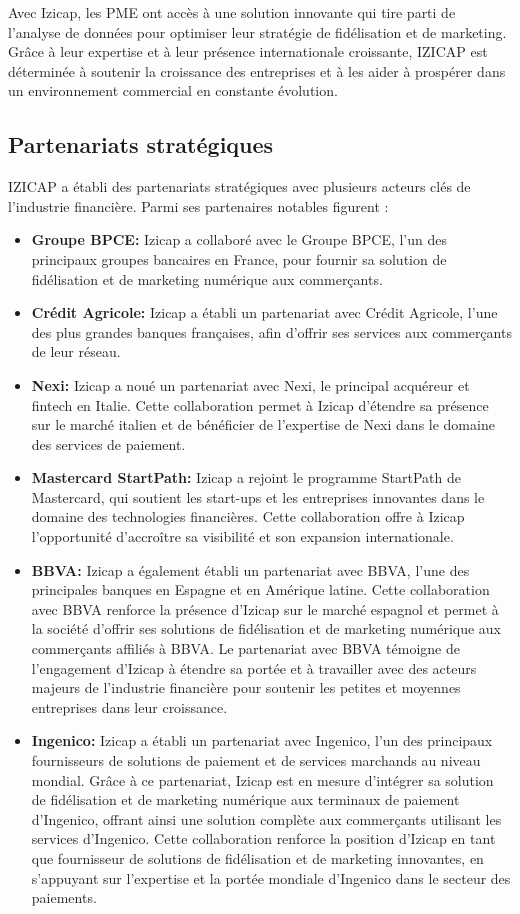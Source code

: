 Avec Izicap, les PME ont accès à une solution innovante qui tire parti de l'analyse de données pour optimiser leur stratégie de fidélisation et de marketing. Grâce à leur expertise et à leur présence internationale croissante, IZICAP est déterminée à soutenir la croissance des entreprises et à les aider à prospérer dans un environnement commercial en constante évolution.

\cite{izicap}

\subsection{Partenariats stratégiques}
IZICAP a établi des partenariats stratégiques avec plusieurs acteurs clés de l'industrie financière. Parmi ses partenaires notables figurent :
\begin{itemize}
    \item \textbf{Groupe BPCE:} Izicap a collaboré avec le Groupe BPCE, l'un des principaux groupes bancaires en France, pour fournir sa solution de fidélisation et de marketing numérique aux commerçants.
    \item \textbf{Crédit Agricole:} Izicap a établi un partenariat avec Crédit Agricole, l'une des plus grandes banques françaises, afin d'offrir ses services aux commerçants de leur réseau.
    \item \textbf{Nexi:} Izicap a noué un partenariat avec Nexi, le principal acquéreur et fintech en Italie. Cette collaboration permet à Izicap d'étendre sa présence sur le marché italien et de bénéficier de l'expertise de Nexi dans le domaine des services de paiement.
    \item \textbf{Mastercard StartPath:} Izicap a rejoint le programme StartPath de Mastercard, qui soutient les start-ups et les entreprises innovantes dans le domaine des technologies financières. Cette collaboration offre à Izicap l'opportunité d'accroître sa visibilité et son expansion internationale.
    \item \textbf{BBVA:} Izicap a également établi un partenariat avec BBVA, l'une des principales banques en Espagne et en Amérique latine. Cette collaboration avec BBVA renforce la présence d'Izicap sur le marché espagnol et permet à la société d'offrir ses solutions de fidélisation et de marketing numérique aux commerçants affiliés à BBVA. Le partenariat avec BBVA témoigne de l'engagement d'Izicap à étendre sa portée et à travailler avec des acteurs majeurs de l'industrie financière pour soutenir les petites et moyennes entreprises dans leur croissance.
    \item \textbf{Ingenico:} Izicap a établi un partenariat avec Ingenico, l'un des principaux fournisseurs de solutions de paiement et de services marchands au niveau mondial. Grâce à ce partenariat, Izicap est en mesure d'intégrer sa solution de fidélisation et de marketing numérique aux terminaux de paiement d'Ingenico, offrant ainsi une solution complète aux commerçants utilisant les services d'Ingenico. Cette collaboration renforce la position d'Izicap en tant que fournisseur de solutions de fidélisation et de marketing innovantes, en s'appuyant sur l'expertise et la portée mondiale d'Ingenico dans le secteur des paiements.
\end{itemize}
